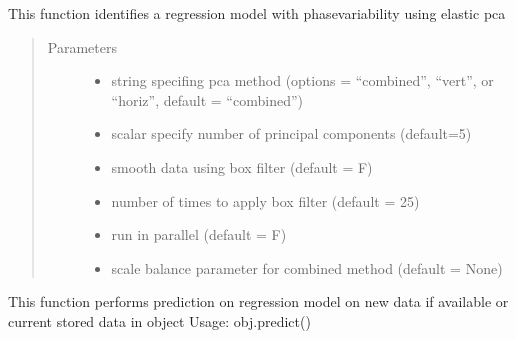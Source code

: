 \documentclass[letterpaper,10pt,english]{sphinxmanual}
\begin{document}
\begin{fulllineitems}
\begin{fulllineitems}
\label{\detokenize{pcr_regression:pcr_regression.elastic_pcr_regression.calc_model}}
This function identifies a regression model with phase\sphinxhyphen{}variability
using elastic pca
\begin{quote}\begin{description}
\item[{Parameters}] \leavevmode\begin{itemize}
\item {} 
 \textendash{} string specifing pca method (options = “combined”,
“vert”, or “horiz”, default = “combined”)

\item {} 
 \textendash{} scalar specify number of principal components (default=5)

\item {} 
 \textendash{} smooth data using box filter (default = F)

\item {} 
 \textendash{} number of times to apply box filter (default = 25)

\item {} 
 \textendash{} run in parallel (default = F)

\item {} 
 \textendash{} scale balance parameter for combined method (default = None)

\end{itemize}

\end{description}\end{quote}

\end{fulllineitems}


\begin{fulllineitems}
\label{\detokenize{pcr_regression:pcr_regression.elastic_pcr_regression.predict}}
This function performs prediction on regression model on new data if available or current stored data in object
Usage:  obj.predict()
\begin{quote}


\end{quote}
\end{fulllineitems}
\end{fulllineitems}
\end{document}
